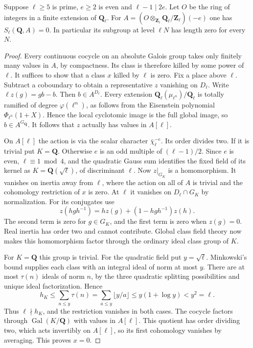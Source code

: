 \begin{proposition}\label{newcoh:zero}
Suppose \(\ell\ge5\) is prime, \(e\ge2\) is even and \(\ell-1\mid 2e\).
Let \(O\) be the ring of integers in a finite extension of
\(\mathbf Q_\ell\). For \(A=(O\otimes_{\mathbf Z_\ell}
\mathbf Q_\ell/\mathbf Z_\ell)(-e)\) one has \(S_\ell(\mathbf Q,A)=0\).
In particular its subgroup at level \(\ell N\) has length zero for
every \(N\).
\end{proposition}
\begin{proof}
Every continuous cocycle on an absolute Galois group takes only finitely
many values in \(A\), by compactness. Its class is therefore killed by
some power of \(\ell\). It suffices to show that a class \(x\) killed
by \(\ell\) is zero. Fix a place above \(\ell\). Subtract a coboundary
to obtain a representative \(z\) vanishing on \(D_\ell\). Write
\(\ell z(g)=g b-b\). Then \(b\in A^{D_\ell}\). Every extension
\(\mathbf Q_\ell(\mu_{\ell^n})/\mathbf Q_\ell\) is totally ramified
of degree \(\varphi(\ell^n)\), as follows from the Eisenstein
polynomial \(\Phi_{\ell^n}(1+X)\). Hence the local cyclotomic image is
the full global image, so \(b\in A^{G_{\mathbf Q}}\). It follows that
\(z\) actually has values in \(A[\ell]\).

On \(A[\ell]\) the action is via the scalar character
\(\bar\chi_\ell^{-e}\). Its order divides two. If it is trivial put
\(K=\mathbf Q\). Otherwise \(e\) is an odd multiple of
\((\ell-1)/2\). Since \(e\) is even, \(\ell\equiv1\bmod4\), and the
quadratic Gauss sum identifies the fixed field of its kernel as
\(K=\mathbf Q(\sqrt{\ell})\), of discriminant \(\ell\).
Now \(z|_{G_K}\) is a homomorphism. It vanishes on inertia away from
\(\ell\), where the action on all of \(A\) is trivial and the
cohomology restriction of \(x\) is zero. At \(\ell\) it vanishes on
\(D_\ell\cap G_K\) by normalization. For its conjugates use
\[
 z(hgh^{-1})=h z(g)+(1-hgh^{-1})z(h).
\]
The second term is zero for \(g\in G_K\), and the first term is zero
when \(z(g)=0\). Real inertia has order two and cannot contribute.
Global class field theory now makes this homomorphism factor through
the ordinary ideal class group of \(K\).

For \(K=\mathbf Q\) this group is trivial. For the quadratic field put
\(y=\sqrt{\ell}\). Minkowski's bound supplies each class with an
integral ideal of norm at most \(y\). There are at most \(\tau(n)\)
ideals of norm \(n\), by the three quadratic splitting possibilities
and unique ideal factorization. Hence
\[
 h_K\le\sum_{n\le y}\tau(n)=\sum_{a\le y}\lfloor y/a\rfloor
 \le y(1+\log y)<y^2=\ell .
\]
Thus \(\ell\nmid h_K\), and the restriction vanishes in both cases.
The cocycle factors through \(\operatorname{Gal}(K/\mathbf Q)\) with
values in \(A[\ell]\). This quotient has order dividing two, which
acts invertibly on \(A[\ell]\), so its first cohomology vanishes by
averaging. This proves \(x=0\).
\end{proof}
